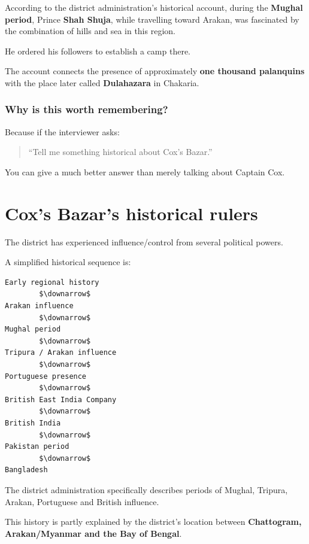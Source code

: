 According to the district administration's historical account, during the \textbf{Mughal period}, Prince \textbf{Shah Shuja}, while travelling toward Arakan, was fascinated by the combination of hills and sea in this region.

He ordered his followers to establish a camp there.

The account connects the presence of approximately \textbf{one thousand palanquins} with the place later called \textbf{Dulahazara} in Chakaria.



\subsubsection{Why is this worth remembering?}

Because if the interviewer asks:

\begin{quote}
``Tell me something historical about Cox's Bazar.''\\
\end{quote}

You can give a much better answer than merely talking about Captain Cox.

\medskip

\section{Cox's Bazar's historical rulers}

The district has experienced influence/control from several political powers.

A simplified historical sequence is:

\begin{lstlisting}
Early regional history
        $\downarrow$
Arakan influence
        $\downarrow$
Mughal period
        $\downarrow$
Tripura / Arakan influence
        $\downarrow$
Portuguese presence
        $\downarrow$
British East India Company
        $\downarrow$
British India
        $\downarrow$
Pakistan period
        $\downarrow$
Bangladesh
\end{lstlisting}

The district administration specifically describes periods of Mughal, Tripura, Arakan, Portuguese and British influence.

This history is partly explained by the district's location between \textbf{Chattogram, Arakan/Myanmar and the Bay of Bengal}.

\medskip

